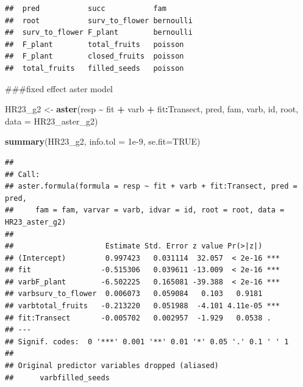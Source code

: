 \documentclass[
]{article}
\newenvironment{Shaded}{\begin{snugshade}}{\end{snugshade}}
\newcommand{\AttributeTok}[1]{\textcolor[rgb]{0.13,0.29,0.53}{#1}}
\newcommand{\ConstantTok}[1]{\textcolor[rgb]{0.56,0.35,0.01}{#1}}
\newcommand{\FloatTok}[1]{\textcolor[rgb]{0.00,0.00,0.81}{#1}}
\newcommand{\FunctionTok}[1]{\textcolor[rgb]{0.13,0.29,0.53}{\textbf{#1}}}
\newcommand{\NormalTok}[1]{#1}
\newcommand{\OtherTok}[1]{\textcolor[rgb]{0.56,0.35,0.01}{#1}}
\newcommand{\SpecialCharTok}[1]{\textcolor[rgb]{0.81,0.36,0.00}{\textbf{#1}}}
\begin{document}
\begin{verbatim}
##  pred           succ           fam      
##  root           surv_to_flower bernoulli
##  surv_to_flower F_plant        bernoulli
##  F_plant        total_fruits   poisson  
##  F_plant        closed_fruits  poisson  
##  total_fruits   filled_seeds   poisson
\end{verbatim}

\#\#\#fixed effect aster model

\begin{Shaded}
\begin{Highlighting}[]
\NormalTok{HR23\_g2 }\OtherTok{\textless{}{-}} \FunctionTok{aster}\NormalTok{(resp }\SpecialCharTok{\textasciitilde{}}\NormalTok{ fit }\SpecialCharTok{+}\NormalTok{ varb }\SpecialCharTok{+}\NormalTok{ fit}\SpecialCharTok{:}\NormalTok{Transect, pred, fam, varb, id, root, }\AttributeTok{data =}\NormalTok{ HR23\_aster\_g2) }

\FunctionTok{summary}\NormalTok{(HR23\_g2, }\AttributeTok{info.tol =} \FloatTok{1e{-}9}\NormalTok{, }\AttributeTok{se.fit=}\ConstantTok{TRUE}\NormalTok{)}
\end{Highlighting}
\end{Shaded}

\begin{verbatim}
## 
## Call:
## aster.formula(formula = resp ~ fit + varb + fit:Transect, pred = pred, 
##     fam = fam, varvar = varb, idvar = id, root = root, data = HR23_aster_g2)
## 
##                     Estimate Std. Error z value Pr(>|z|)    
## (Intercept)         0.997423   0.031114  32.057  < 2e-16 ***
## fit                -0.515306   0.039611 -13.009  < 2e-16 ***
## varbF_plant        -6.502225   0.165081 -39.388  < 2e-16 ***
## varbsurv_to_flower  0.006073   0.059084   0.103   0.9181    
## varbtotal_fruits   -0.213220   0.051988  -4.101 4.11e-05 ***
## fit:Transect       -0.005702   0.002957  -1.929   0.0538 .  
## ---
## Signif. codes:  0 '***' 0.001 '**' 0.01 '*' 0.05 '.' 0.1 ' ' 1
## 
## Original predictor variables dropped (aliased)
##      varbfilled_seeds
\end{verbatim}
\end{document}
